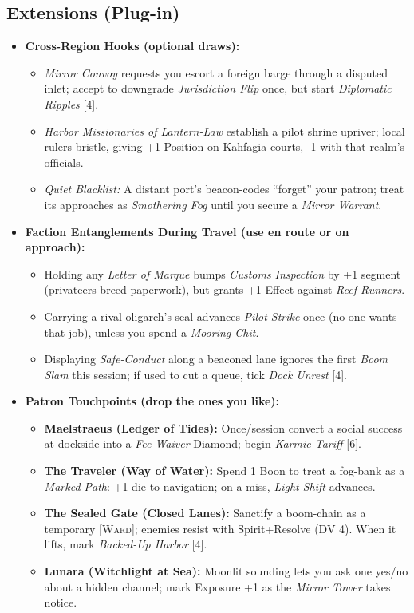 \subsection*{Extensions (Plug-in)}
\label{sec:kahfagia-extensions}
\begin{itemize}
  \item \textbf{Cross-Region Hooks (optional draws):}
  \begin{itemize}
    \item \emph{Mirror Convoy} requests you escort a foreign barge through a disputed inlet; accept to downgrade \emph{Jurisdiction Flip} once, but start \emph{Diplomatic Ripples} [4].
    \item \emph{Harbor Missionaries of Lantern-Law} establish a pilot shrine upriver; local rulers bristle, giving +1 Position on Kahfagia courts, -1 with that realm’s officials.
    \item \emph{Quiet Blacklist:} A distant port’s beacon-codes “forget” your patron; treat its approaches as \emph{Smothering Fog} until you secure a \emph{Mirror Warrant}.
  \end{itemize}

  \item \textbf{Faction Entanglements During Travel (use en route or on approach):}
  \begin{itemize}
    \item Holding any \emph{Letter of Marque} bumps \emph{Customs Inspection} by +1 segment (privateers breed paperwork), but grants +1 Effect against \emph{Reef-Runners}.
    \item Carrying a rival oligarch’s seal advances \emph{Pilot Strike} once (no one wants that job), unless you spend a \emph{Mooring Chit}.
    \item Displaying \emph{Safe-Conduct} along a beaconed lane ignores the first \emph{Boom Slam} this session; if used to cut a queue, tick \emph{Dock Unrest} [4].
  \end{itemize}

  \item \textbf{Patron Touchpoints (drop the ones you like):}
  \begin{itemize}
    \item \textbf{Maelstraeus (Ledger of Tides):} Once/session convert a social success at dockside into a \emph{Fee Waiver} Diamond; begin \emph{Karmic Tariff} [6].
    \item \textbf{The Traveler (Way of Water):} Spend 1 Boon to treat a fog-bank as a \emph{Marked Path}: +1 die to navigation; on a miss, \emph{Light Shift} advances.
    \item \textbf{The Sealed Gate (Closed Lanes):} Sanctify a boom-chain as a temporary [\textsc{Ward}]; enemies resist with Spirit+Resolve (DV 4). When it lifts, mark \emph{Backed-Up Harbor} [4].
    \item \textbf{Lunara (Witchlight at Sea):} Moonlit sounding lets you ask one yes/no about a hidden channel; mark Exposure +1 as the \emph{Mirror Tower} takes notice.
  \end{itemize}


\end{itemize}
